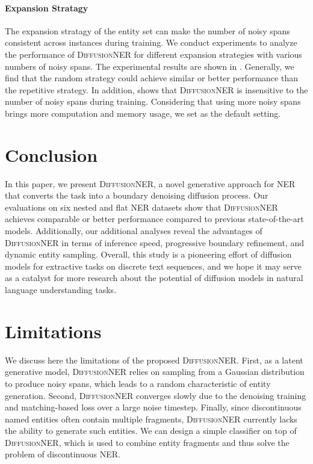\documentclass[11pt]{article}
\begin{document}
\paragraph{Expansion Stratagy}
\label{ana:expansion}
The expansion stratagy of the entity set can make the number of  noisy spans consistent across instances during training. We conduct experiments to analyze the performance of \textsc{DiffusionNER} for different expansion strategies with various numbers of noisy spans. The experimental results are shown in . Generally, we find that the random strategy could achieve similar or better performance than the repetitive strategy. In addition,  shows that \textsc{DiffusionNER} is insensitive to the number of noisy spans during training. Considering that using more noisy spans brings more computation and memory usage, we set  as the default setting.


\section{Conclusion}


In this paper, we present \textsc{DiffusionNER}, a novel generative approach for NER that converts the task into a boundary denoising diffusion process. Our evaluations on six nested and flat NER datasets show that \textsc{DiffusionNER} achieves comparable or better performance compared to previous state-of-the-art models. Additionally, our additional analyses reveal the advantages of \textsc{DiffusionNER} in terms of inference speed, progressive boundary refinement, and dynamic entity sampling. Overall, this study is a pioneering effort of diffusion models for extractive tasks on discrete text sequences, and we hope it may serve as a catalyst for more research about the potential of diffusion models in natural language understanding tasks.



\section*{Limitations}

We discuss here the limitations of the proposed \textsc{DiffusionNER}. First, as a latent generative model, \textsc{DiffusionNER} relies on sampling from a Gaussian distribution to produce noisy spans, which leads to a random characteristic of entity generation. Second, \textsc{DiffusionNER} converges slowly due to the denoising training and matching-based loss over a large noise timestep. Finally, since discontinuous named entities often contain multiple fragments, \textsc{DiffusionNER} currently lacks the ability to generate such entities.
We can design a simple classifier on top of \textsc{DiffusionNER}, which is used to combine entity fragments and thus solve the problem of discontinuous NER.
\end{document}

